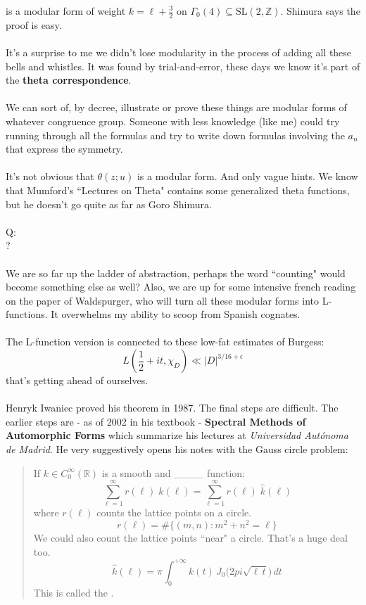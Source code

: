\documentclass[12pt]{article}
\begin{document}
is a modular form of weight $ k = \ell + \frac{3}{2}$ on $\Gamma_0(4) \subseteq \mathrm{SL}(2, \mathbb{Z})$. Shimura says the proof is easy. \\ \\
It's a surprise to me we didn't lose modularity in the process of adding all these bells and whistles.  It was found by trial-and-error, these days we know it's part of the \textbf{theta correspondence}.  \\ \\
We can sort of, by decree, illustrate or prove these things are modular forms of whatever congruence group.  Someone with less knowledge (like me) could try running through all the formulas and try to write down formulas involving the $a_n$ that express the symmetry. \\ \\
It's not obvious that $\theta(z; u)$ is a modular form.  And only vague hints.  We know that Mumford's ``Lectures on Theta" contains some generalized theta functions, but he doesn't go quite as far as Goro Shimura. \\ \\
Q: \\ 
{\color{orange!50!green}{Do coeffients of modular forms obtained by theta functions, count solutions to an equation}}? \\ \\
We are so far up the ladder of abstraction, perhaps the word ``counting" would become something else as well?  Also, we are up for some intensive french reading on the paper of Waldspurger, who will turn all these modular forms into L-functions. It overwhelms my ability to scoop from Spanish cognates. \\ \\
The L-function version is connected to these low-fat estimates of Burgess:
$$ L(\frac{1}{2} + it, \chi_D ) \ll |D|^{3/16 + \epsilon} $$
that's getting ahead of ourselves. \\ \\
Henryk Iwaniec proved his theorem in 1987.  The final steps are difficult.  The earlier steps are - as of 2002 in his textbook - \textbf{Spectral Methods of Automorphic Forms} which summarize his lectures at \textit{Universidad Aut\'{o}noma de Madrid}.  He very suggestively opens his notes with the Gauss circle problem:
\begin{quotation} If $k \in C_0^\infty(\mathbb{R})$ is a smooth and \_\_\_\_ function:
$$ \sum_{\ell=1}^\infty r(\ell) \; k(\ell) = \sum_{\ell=1}^\infty r(\ell) \; \widehat{k}(\ell)$$
where $r(\ell)$ counts the lattice points on a circle.  
$$ r(\ell) = \# \Big\{ (m,n): m^2 + n^2 = \ell  \Big\}  $$
We could also count the lattice points ``near" a circle.  That's a huge deal too.
$$ \widehat{k} (\ell) = \pi \int_0^{+\infty} k(t) \, J_0 \big( 2pi \sqrt{\ell \, t} \big) \, dt$$
This is called the {\color{red!50!orange}{Hankel transform}}.
\end{quotation}
\end{document}
